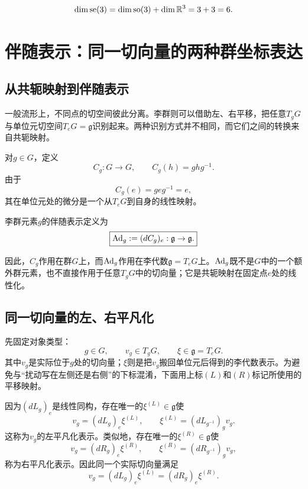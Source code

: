 \begin{theorem}[$\se(3)$的维数]
\[
    \dim\operatorname{se}(3)=\dim\operatorname{so}(3)+\dim\mathbb{R}^3=3+3=6.
\]
\end{theorem}


\section{伴随表示：同一切向量的两种群坐标表达}

\subsection{从共轭映射到伴随表示}

一般流形上，不同点的切空间彼此分离。李群则可以借助左、右平移，把任意$T_gG$与单位元切空间$T_eG=\mathfrak g$识别起来。两种识别方式并不相同，而它们之间的转换来自共轭映射。

\begin{definition}[共轭映射]
对$g\in G$，定义
\[
    C_g:G\to G,
    \qquad
    C_g(h)=ghg^{-1}.
\]
由于
\[
    C_g(e)=geg^{-1}=e,
\]
其在单位元处的微分是一个从$T_eG$到自身的线性映射。
\end{definition}

\begin{definition}[伴随表示]
李群元素$g$的伴随表示定义为
\[
    \boxed{
    \operatorname{Ad}_g:=(dC_g)_e:\mathfrak g\to\mathfrak g.
    }
\]
\end{definition}

因此，$C_g$作用在群$G$上，而$\operatorname{Ad}_g$作用在李代数$\mathfrak g=T_eG$上。$\operatorname{Ad}_g$既不是$G$中的一个额外群元素，也不直接作用于任意$T_gG$中的切向量；它是共轭映射在固定点$e$处的线性化。

\subsection{同一切向量的左、右平凡化}

先固定对象类型：
\[
    g\in G,
    \qquad
    v_g\in T_gG,
    \qquad
    \xi\in\mathfrak g=T_eG.
\]
其中$v_g$是实际位于$g$处的切向量；$\xi$则是把$v_g$搬回单位元后得到的李代数表示。为避免与“扰动写在左侧还是右侧”的下标混淆，下面用上标$(L)$和$(R)$标记所使用的平移映射。

因为$(dL_g)_e$是线性同构，存在唯一的$\xi^{(L)}\in\mathfrak g$使
\[
    v_g=(dL_g)_e\xi^{(L)},
    \qquad
    \xi^{(L)}=(dL_{g^{-1}})_g v_g.
\]
这称为$v_g$的左平凡化表示。类似地，存在唯一的$\xi^{(R)}\in\mathfrak g$使
\[
    v_g=(dR_g)_e\xi^{(R)},
    \qquad
    \xi^{(R)}=(dR_{g^{-1}})_g v_g,
\]
称为右平凡化表示。因此同一个实际切向量满足
\[
    \boxed{
    v_g=(dL_g)_e\xi^{(L)}=(dR_g)_e\xi^{(R)}.
    }
\]

